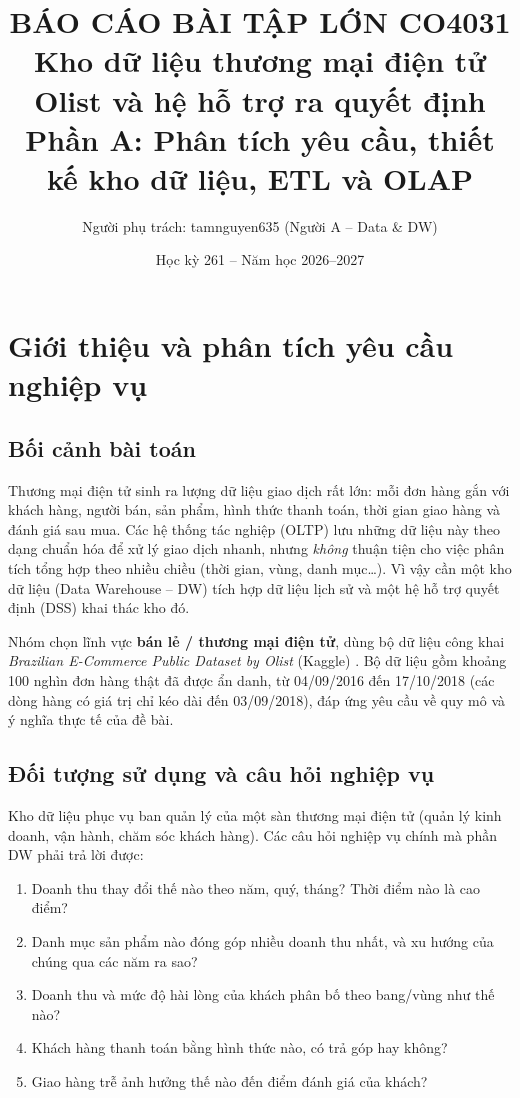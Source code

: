 \documentclass[12pt,a4paper]{article}
\title{\textbf{BÁO CÁO BÀI TẬP LỚN CO4031}\\[4pt]
\Large Kho dữ liệu thương mại điện tử Olist và hệ hỗ trợ ra quyết định\\[4pt]
\large Phần A: Phân tích yêu cầu, thiết kế kho dữ liệu, ETL và OLAP}
\author{Người phụ trách: tamnguyen635 (Người A -- Data \& DW)}
\date{Học kỳ 261 -- Năm học 2026--2027}
\begin{document}
\maketitle
\tableofcontents
\clearpage

\section{Giới thiệu và phân tích yêu cầu nghiệp vụ}

\subsection{Bối cảnh bài toán}
Thương mại điện tử sinh ra lượng dữ liệu giao dịch rất lớn: mỗi đơn hàng gắn với khách hàng, người bán,
sản phẩm, hình thức thanh toán, thời gian giao hàng và đánh giá sau mua. Các hệ thống tác nghiệp (OLTP)
lưu những dữ liệu này theo dạng chuẩn hóa để xử lý giao dịch nhanh, nhưng \emph{không} thuận tiện cho việc
phân tích tổng hợp theo nhiều chiều (thời gian, vùng, danh mục\ldots). Vì vậy cần một kho dữ liệu
(Data Warehouse -- DW) tích hợp dữ liệu lịch sử và một hệ hỗ trợ quyết định (DSS) khai thác kho đó.

Nhóm chọn lĩnh vực \textbf{bán lẻ / thương mại điện tử}, dùng bộ dữ liệu công khai
\emph{Brazilian E-Commerce Public Dataset by Olist} (Kaggle) \cite{olist}. Bộ dữ liệu gồm khoảng 100 nghìn đơn hàng thật
đã được ẩn danh, từ 04/09/2016 đến 17/10/2018 (các dòng hàng có giá trị chỉ kéo dài đến 03/09/2018), đáp ứng yêu cầu về quy mô và ý nghĩa thực tế của đề bài.

\subsection{Đối tượng sử dụng và câu hỏi nghiệp vụ}
Kho dữ liệu phục vụ ban quản lý của một sàn thương mại điện tử (quản lý kinh doanh, vận hành, chăm sóc
khách hàng). Các câu hỏi nghiệp vụ chính mà phần DW phải trả lời được:

\begin{enumerate}[nosep]
  \item Doanh thu thay đổi thế nào theo năm, quý, tháng? Thời điểm nào là cao điểm?
  \item Danh mục sản phẩm nào đóng góp nhiều doanh thu nhất, và xu hướng của chúng qua các năm ra sao?
  \item Doanh thu và mức độ hài lòng của khách phân bố theo bang/vùng như thế nào?
  \item Khách hàng thanh toán bằng hình thức nào, có trả góp hay không?
  \item Giao hàng trễ ảnh hưởng thế nào đến điểm đánh giá của khách?
\end{enumerate}
\end{document}
